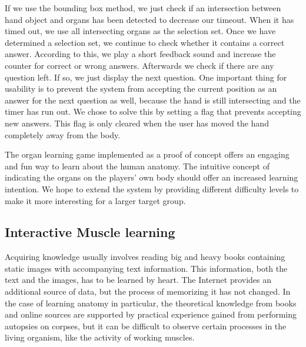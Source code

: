 If we use the bounding box method, we just check if an intersection between hand object and organs has been detected to decrease our timeout. When it has timed out, we use all intersecting organs as the selection set.
Once we have determined a selection set, we continue to check whether it contains a correct answer. According to this, we play a short feedback sound and increase the counter for correct or wrong answers. Afterwards we check if there are any question left. If so, we just display the next question. One important thing for usability is to prevent the system from accepting the current position as an answer for the next question as well, because the hand is still intersecting and the timer has run out. We chose to solve this by setting a flag that prevents accepting new answers. This flag is only cleared when the user has moved the hand completely away from the body.

The organ learning game implemented as a proof of concept offers an engaging and fun way to learn about the human anatomy. The intuitive concept of indicating the organs on the players' own body should offer an increased learning intention. 
We hope to extend the system by providing different difficulty levels to make it more interesting for a larger target group.
 
\subsection{Interactive Muscle learning}
Acquiring knowledge usually involves reading big and heavy books containing static images with accompanying text information. This information, both the text and the
images, has to be learned by heart. The Internet provides an additional source of data, but the process of memorizing it has not changed. In the case of learning anatomy in particular, the theoretical knowledge from books and online sources are supported by practical experience gained from performing autopsies on corpses, but it can be difficult to observe certain processes in the living organism, like the activity of working muscles.

